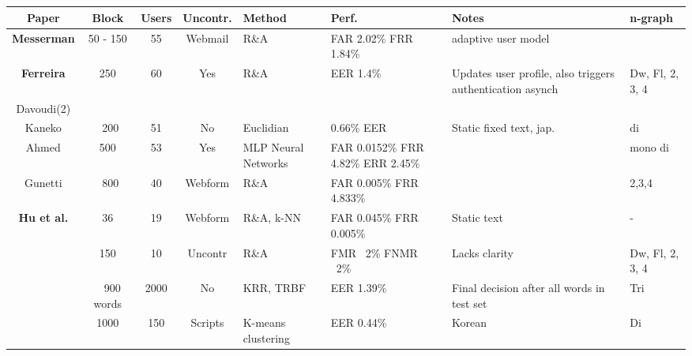 \documentclass[informationsecurity]{gucmasterproject}
\begin{document}
\\\\\\\\
\begin{table}[h]
\begin{tabular}{ |c|c|c|c|p{1.5cm}|p{1.9cm}|p{2cm}|p{1.5cm}| } 
 \hline
 \bf Paper & \bf Block & \bf Users & \bf Uncontr. & \bf Method & \bf Perf. & \bf Notes & n-graph\\ \hline
 \bf Messerman & 50 - 150 & 55 & Webmail & R\&A &  FAR 2.02\% FRR 1.84\% & adaptive user model & \\ \hline
 \bf Ferreira & 250 & 60 & Yes & R\&A & EER 1.4\% & Updates user profile, also triggers authentication asynch & Dw, Fl, 2, 3, 4\\ \hline
 Davoudi(2) & & & & & & & \\ \hline
 Kaneko & ~200 & 51 & No & Euclidian & 0.66\% EER & Static fixed text, jap. & di \\ \hline
 Ahmed & 500 & 53 & Yes & MLP Neural Networks & FAR 0.0152\% FRR 4.82\% ERR 2.45\% & & mono di\\\hline
 Gunetti & ~800 & 40 & Webform & R\&A & FAR 0.005\% FRR 4.833\% & & 2,3,4\\ \hline
 \bf Hu et al. & 36 & 19 & Webform & R\&A, k-NN & FAR 0.045\% FRR 0.005\% & Static text & - \\ \hline
 \cite{Pinto2014} & 150 & 10 & Uncontr & R\&A & FMR ~2\% FNMR ~2\% & Lacks clarity & Dw, Fl, 2, 3, 4 \\ \hline
 \cite{900words} & ~ 900 words & 2000 & No & KRR, TRBF & EER 1.39\% & Final decision after all words in test set & Tri \\ \hline
 \cite{KIM2017} & 1000 & 150 & Scripts & K-means clustering & EER 0.44\% & Korean & Di \\ \hline
 

 
\end{tabular}
\end{table}
\end{document}
